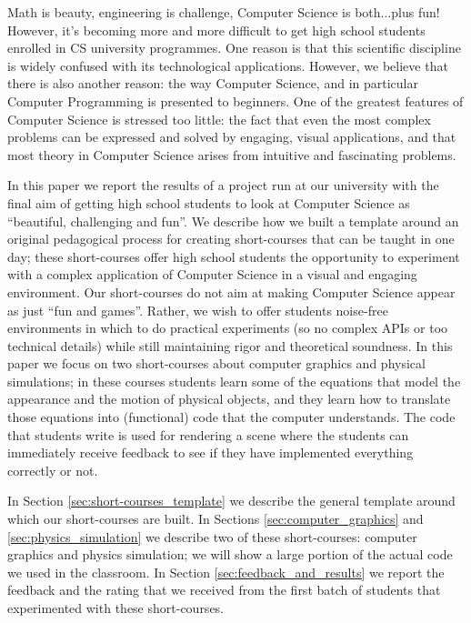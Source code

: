 
Math is beauty, engineering is challenge, Computer Science is both...plus fun!
However, it's becoming more and more difficult to get high school students enrolled in CS university programmes. One reason is that this scientific discipline is widely confused with its technological applications. However, we believe that there is also another reason: the way Computer Science, and in particular Computer Programming is presented to beginners. One of the greatest features of Computer Science is stressed too little: the fact that even the most complex problems can be expressed and solved by engaging, visual applications, and that most theory in Computer Science arises from intuitive and fascinating problems.

In this paper we report the results of a project run at our university with the final aim of getting high school students to look at Computer Science as ``beautiful, challenging and fun''. We describe how we built a template around an original pedagogical process for creating short-courses that can be taught in one day; these short-courses offer high school students the opportunity to experiment with a complex application of Computer Science in a visual and engaging environment. Our short-courses do not aim at making Computer Science appear as just ``fun and games''. Rather, we wish to offer students noise-free environments in which to do practical experiments (so no complex APIs or too technical details) while still maintaining rigor and theoretical soundness. In this paper we focus on two short-courses about computer graphics and physical simulations; in these courses students learn some of the equations that model the appearance and the motion of physical objects, and they learn how to translate those equations into (functional) code that the computer understands. The code that students write is used for rendering a scene where the students can immediately receive feedback to see if they have implemented everything correctly or not.

In Section \ref{sec:short-courses_template} we describe the general template around which our short-courses are built. In Sections \ref{sec:computer_graphics} and \ref{sec:physics_simulation} we describe two of these short-courses: computer graphics and physics simulation; we will show a large portion of the actual code we used in the classroom. In Section \ref{sec:feedback_and_results} we report the feedback and the rating that we received from the first batch of students that experimented with these short-courses.

